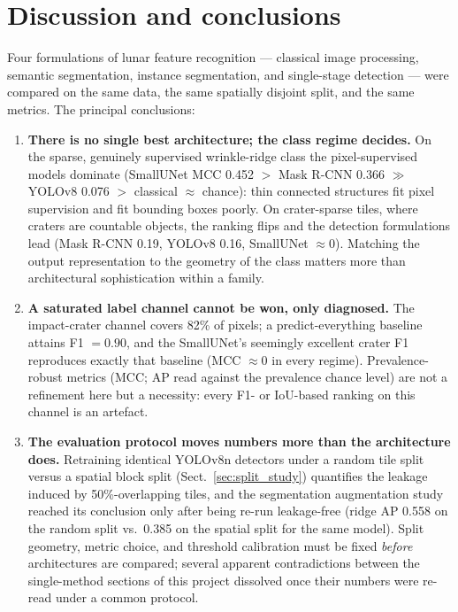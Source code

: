 \section{Discussion and conclusions}
\label{sec:conclusions_global}

Four formulations of lunar feature recognition --- classical image processing, semantic segmentation, instance segmentation, and single-stage detection --- were compared on the same data, the same spatially disjoint split, and the same metrics. The principal conclusions:

\begin{enumerate}
    \item \textbf{There is no single best architecture; the class regime decides.} On the sparse, genuinely supervised wrinkle-ridge class the pixel-supervised models dominate (SmallUNet MCC 0.452 $>$ Mask R-CNN 0.366 $\gg$ YOLOv8 0.076 $>$ classical $\approx$ chance): thin connected structures fit pixel supervision and fit bounding boxes poorly. On crater-sparse tiles, where craters are countable objects, the ranking flips and the detection formulations lead (Mask R-CNN 0.19, YOLOv8 0.16, SmallUNet $\approx 0$). Matching the output representation to the geometry of the class matters more than architectural sophistication within a family.

    \item \textbf{A saturated label channel cannot be won, only diagnosed.} The impact-crater channel covers 82\% of pixels; a predict-everything baseline attains F1 $= 0.90$, and the SmallUNet's seemingly excellent crater F1 reproduces exactly that baseline (MCC $\approx 0$ in every regime). Prevalence-robust metrics (MCC; AP read against the prevalence chance level) are not a refinement here but a necessity: every F1- or IoU-based ranking on this channel is an artefact.

    \item \textbf{The evaluation protocol moves numbers more than the architecture does.} Retraining identical YOLOv8n detectors under a random tile split versus a spatial block split (Sect.~\ref{sec:split_study}) quantifies the leakage induced by 50\%-overlapping tiles, and the segmentation augmentation study reached its conclusion only after being re-run leakage-free (ridge AP 0.558 on the random split vs.\ 0.385 on the spatial split for the same model). Split geometry, metric choice, and threshold calibration must be fixed \emph{before} architectures are compared; several apparent contradictions between the single-method sections of this project dissolved once their numbers were re-read under a common protocol.


\end{enumerate}
